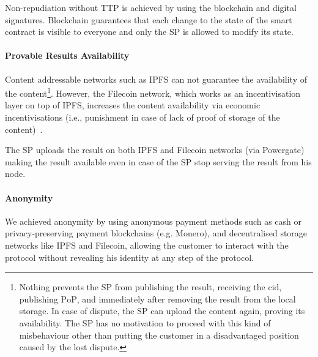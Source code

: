 \documentclass{ieeeaccess}
\begin{document}
Non-repudiation without TTP is achieved by using the blockchain and digital signatures. Blockchain guarantees that each change to the state of the smart contract is visible to everyone and only the SP is allowed to modify its state. 

\paragraph{Provable Results Availability}
Content addressable networks such as IPFS can not guarantee the availability of the content\footnote{Nothing prevents the SP from publishing the result, receiving the $\mathrm{cid}$, publishing $\mathrm{PoP}$, and immediately after removing the result from the local storage. In case of dispute, the SP can upload the content again, proving its availability. The SP has no motivation to proceed with this kind of misbehaviour other than putting the customer in a disadvantaged position caused by the lost dispute.}. However, the Filecoin network, which works as an incentivisation layer on top of IPFS, increases the content availability via economic incentivisations (i.e., punishment in case of lack of proof of storage of the content)~\cite{protocollabsFilecoinDecentralizedStorage2017}.

The SP uploads the result on both IPFS and Filecoin networks (via Powergate) making the result available even in case of the SP stop serving the result from his node.

\paragraph{Anonymity}
We achieved anonymity by using anonymous payment methods such as cash or privacy-preserving payment blockchains (e.g. Monero), and decentralised storage networks like IPFS and Filecoin, allowing the customer to interact with the protocol without revealing his identity at any step of the protocol.
\end{document}
